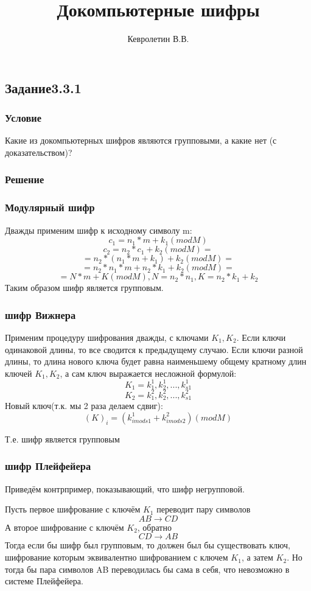 \documentclass[10pt,a4paper]{article}
\author{Кевролетин В.В.}
\title{Докомпьютерные шифры}
\begin{document}
\maketitle

\subsection*{Задание3.3.1}
\subsubsection*{Условие}
Какие из докомпьютерных шифров являются групповыми, а какие нет (с
доказательством)?
\subsubsection*{Решение}
\subsubsection*{Модулярный шифр}

Дважды применим шифр к исходному символу m:\\
$$ c_1 = n_1 * m + k_1 (mod M) $$
$$ c_2 = n_2 * c_1 + k_2 (mod M) = $$
$$ = n_2 * (n_1 * m + k_1) + k_2 (mod M) = $$
$$ = n_2 * n_1 * m + n_2 * k_1 + k_2 (mod M) = $$
$$ = N * m + K (mod M), N = n_2 * n_1, K = n_2 * k_1 + k_2 $$
Таким образом шифр является групповым.

\subsubsection*{шифр Вижнера}
Применим процедуру шифрования дважды, с ключами $ K_1, K_2 $. Если
ключи одинаковой длины, то все сводится к предыдущему случаю. Если
ключи разной длины, то длина нового ключа будет равна наименьшему
общему кратному длин ключей $ K_1, K_2 $, а сам ключ выражается
несложной формулой:
$$ K_1 = k_1^1,k_2^1,...,k_{s1}^1 $$
$$ K_2 = k_1^2,k_2^2,...,k_{s1}^2 $$
Новый ключ(т.к. мы 2 раза делаем сдвиг):
$$ (K)_i = (k_{i mod s1}^1 + k_{i mod s2}^2) (mod M) $$

Т.е. шифр является групповым

\subsubsection*{шифр Плейфейера}

Приведём контрпример, показывающий, что шифр негрупповой.

Пусть первое шифрование с ключём $K_1$ переводит пару символов 
$$ AB \rightarrow CD $$
А второе шифрование с ключём $K_2$, обратно
$$ CD \rightarrow AB $$
Тогда если бы шифр был групповым, то должен был бы существовать ключ,
шифрование которым эквивалентно шифрованием с ключем $K_1$, а затем 
$K_2$. Но тогда бы пара символов AB переводилась бы сама в себя, что
невозможно в системе Плейфейера.
\end{document}
